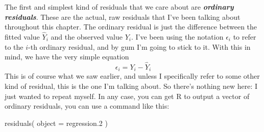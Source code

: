 \documentclass[
]{book}
\newenvironment{Shaded}{\begin{snugshade}}{\end{snugshade}}
\newcommand{\AttributeTok}[1]{\textcolor[rgb]{0.77,0.63,0.00}{#1}}
\newcommand{\FloatTok}[1]{\textcolor[rgb]{0.00,0.00,0.81}{#1}}
\newcommand{\FunctionTok}[1]{\textcolor[rgb]{0.00,0.00,0.00}{#1}}
\newcommand{\NormalTok}[1]{#1}
\begin{document}
The first and simplest kind of residuals that we care about are \textbf{\emph{ordinary residuals}}. These are the actual, raw residuals that I've been talking about throughout this chapter. The ordinary residual is just the difference between the fitted value \(\hat{Y}_i\) and the observed value \(Y_i\). I've been using the notation \(\epsilon_i\) to refer to the \(i\)-th ordinary residual, and by gum I'm going to stick to it. With this in mind, we have the very simple equation
\[
\epsilon_i = Y_i - \hat{Y}_i
\]
This is of course what we saw earlier, and unless I specifically refer to some other kind of residual, this is the one I'm talking about. So there's nothing new here: I just wanted to repeat myself. In any case, you can get R to output a vector of ordinary residuals, you can use a command like this:

\begin{Shaded}
\begin{Highlighting}[]
\FunctionTok{residuals}\NormalTok{( }\AttributeTok{object =}\NormalTok{ regression}\FloatTok{.2}\NormalTok{ )}
\end{Highlighting}
\end{Shaded}
\end{document}
